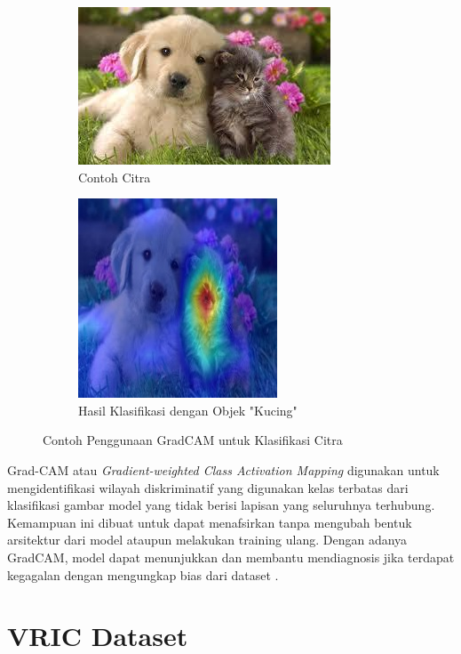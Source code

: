 \begin{figure}[h!]
  \centering
  \begin{subfigure}{.5\textwidth}
    \centering
    \includegraphics[width=.6\linewidth]{gambar/dog_cat.jpg}
    \caption{Contoh Citra}
    \label{fig:contohcitraGradCAM}
  \end{subfigure}%
  \begin{subfigure}{.5\textwidth}
    \centering
    \includegraphics[width=.4\linewidth]{gambar/swinT_cat_gradcam_cam.jpg}
    \caption{Hasil Klasifikasi dengan Objek "Kucing"}
    \label{hasilklasifikasiobjekGradCAM}
  \end{subfigure}
  \caption{Contoh Penggunaan GradCAM untuk Klasifikasi Citra}
  \label{fig:contohpenggunaangradcamuntukklasifikasicitra}
\end{figure}

Grad-CAM atau \emph{Gradient-weighted Class Activation Mapping} digunakan untuk mengidentifikasi wilayah diskriminatif yang digunakan kelas terbatas dari klasifikasi gambar model 
yang tidak berisi lapisan yang seluruhnya terhubung. Kemampuan ini dibuat untuk dapat menafsirkan tanpa mengubah bentuk arsitektur dari model ataupun melakukan training ulang. 
Dengan adanya GradCAM, model dapat menunjukkan dan membantu mendiagnosis jika terdapat kegagalan dengan mengungkap bias dari dataset \parencite{Selvaraju2019}.

\section{VRIC Dataset}
\label{sec:vricdataset}


